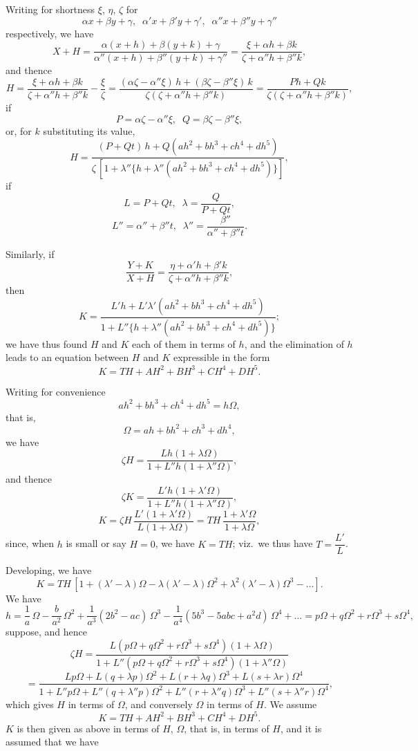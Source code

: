 \documentclass[11pt]{article}
\begin{document}
Writing for shortness $\xi$, $\eta$, $\zeta$ for
\[ \alpha x + \beta y + \gamma,\;\; \alpha'x + \beta'y + \gamma',\;\; \alpha''x + \beta''y + \gamma'' \]
respectively, we have
\[ X + H = \frac{\alpha(x+h) + \beta(y+k) + \gamma}{\alpha''(x+h) + \beta''(y+k) + \gamma''} = \frac{\xi + \alpha h + \beta k}{\zeta + \alpha''h + \beta''k}, \]
and thence
\[ H = \frac{\xi + \alpha h + \beta k}{\zeta + \alpha''h + \beta''k} - \frac{\xi}{\zeta} = \frac{(\alpha\zeta - \alpha''\xi)\,h + (\beta\zeta - \beta''\xi)\,k}{\zeta(\zeta + \alpha''h + \beta''k)} = \frac{Ph + Qk}{\zeta(\zeta + \alpha''h + \beta''k)}, \]
if
\[ P = \alpha\zeta - \alpha''\xi,\;\; Q = \beta\zeta - \beta''\xi, \]
or, for $k$ substituting its value,
\[ H = \frac{(P + Qt)\,h + Q(ah^2 + bh^3 + ch^4 + dh^5)}{\zeta\,[1 + \lambda''\{h + \lambda''(ah^2 + bh^3 + ch^4 + dh^5)\}]}, \]
if
\[ L = P + Qt,\;\; \lambda = \frac{Q}{P + Qt}, \]
\[ L'' = \alpha'' + \beta''t,\;\; \lambda'' = \frac{\beta''}{\alpha'' + \beta''t}. \]

Similarly, if
\[ \frac{Y + K}{X + H} = \frac{\eta + \alpha'h + \beta'k}{\zeta + \alpha''h + \beta''k}, \]
then
\[ K = \frac{L'h + L'\lambda'(ah^2 + bh^3 + ch^4 + dh^5)}{1 + L''\{h + \lambda''(ah^2 + bh^3 + ch^4 + dh^5)\}}; \]
we have thus found $H$ and $K$ each of them in terms of $h$, and the elimination of $h$ leads to an equation between $H$ and $K$ expressible in the form
\[ K = TH + AH^2 + BH^3 + CH^4 + DH^5. \]

Writing for convenience
\[ ah^2 + bh^3 + ch^4 + dh^5 = h\Omega, \]
that is,
\[ \Omega = ah + bh^2 + ch^3 + dh^4, \]
we have
\[ \zeta H = \frac{Lh(1 + \lambda\Omega)}{1 + L''h(1 + \lambda''\Omega)}, \]
and thence
\[ \zeta K = \frac{L'h(1 + \lambda'\Omega)}{1 + L''h(1 + \lambda''\Omega)}, \]
\[ K = \zeta H\,\frac{L'(1 + \lambda'\Omega)}{L(1 + \lambda\Omega)} = TH\,\frac{1 + \lambda'\Omega}{1 + \lambda\Omega}, \]
since, when $h$ is small or say $H = 0$, we have $K = TH$; viz.\ we thus have $T = \dfrac{L'}{L}$.

Developing, we have
\[ K = TH\,[1 + (\lambda' - \lambda)\Omega - \lambda(\lambda' - \lambda)\Omega^2 + \lambda^2(\lambda' - \lambda)\Omega^3 - \ldots]. \]
We have
\[ h = \frac{1}{a}\,\Omega - \frac{b}{a^2}\,\Omega^2 + \frac{1}{a^3}(2b^2 - ac)\,\Omega^3 - \frac{1}{a^4}(5b^3 - 5abc + a^2d)\,\Omega^4 + \ldots = p\Omega + q\Omega^2 + r\Omega^3 + s\Omega^4, \]
suppose, and hence
\[ \zeta H = \frac{L(p\Omega + q\Omega^2 + r\Omega^3 + s\Omega^4)(1 + \lambda\Omega)}{1 + L''(p\Omega + q\Omega^2 + r\Omega^3 + s\Omega^4)(1 + \lambda''\Omega)} \]
\[ = \frac{Lp\Omega + L(q + \lambda p)\Omega^2 + L(r + \lambda q)\Omega^3 + L(s + \lambda r)\Omega^4}{1 + L''p\Omega + L''(q + \lambda''p)\Omega^2 + L''(r + \lambda''q)\Omega^3 + L''(s + \lambda''r)\Omega^4}, \]
which gives $H$ in terms of $\Omega$, and conversely $\Omega$ in terms of $H$. We assume
\[ K = TH + AH^2 + BH^3 + CH^4 + DH^5. \]
$K$ is then given as above in terms of $H$, $\Omega$, that is, in terms of $H$, and it is assumed that we have
\end{document}
